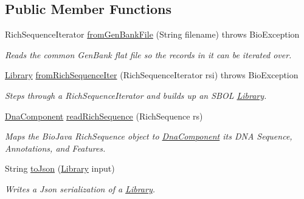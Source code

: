 \subsection*{Public Member Functions}
\begin{DoxyCompactItemize}
\item 
RichSequenceIterator \hyperlink{classorg_1_1sbolstandard_1_1lib_s_b_o_lj_1_1_s_b_o_lutil_a75fcd285825cf6c51c12ebb279ff6918}{fromGenBankFile} (String filename)  throws BioException 
\begin{DoxyCompactList}\small\item\em Reads the common GenBank flat file so the records in it can be iterated over. \item\end{DoxyCompactList}\item 
\hyperlink{classorg_1_1sbolstandard_1_1lib_s_b_o_lj_1_1_library}{Library} \hyperlink{classorg_1_1sbolstandard_1_1lib_s_b_o_lj_1_1_s_b_o_lutil_aa21346b8e64891b0d93df5de2d0b7de9}{fromRichSequenceIter} (RichSequenceIterator rsi)  throws BioException 
\begin{DoxyCompactList}\small\item\em Steps through a RichSequenceIterator and builds up an SBOL \hyperlink{classorg_1_1sbolstandard_1_1lib_s_b_o_lj_1_1_library}{Library}. \item\end{DoxyCompactList}\item 
\hyperlink{classorg_1_1sbolstandard_1_1lib_s_b_o_lj_1_1_dna_component}{DnaComponent} \hyperlink{classorg_1_1sbolstandard_1_1lib_s_b_o_lj_1_1_s_b_o_lutil_aaf09c65d0c5b097c12189b0287d00b3d}{readRichSequence} (RichSequence rs)
\begin{DoxyCompactList}\small\item\em Maps the BioJava RichSequence object to \hyperlink{classorg_1_1sbolstandard_1_1lib_s_b_o_lj_1_1_dna_component}{DnaComponent} its DNA Sequence, Annotations, and Features. \item\end{DoxyCompactList}\item 
String \hyperlink{classorg_1_1sbolstandard_1_1lib_s_b_o_lj_1_1_s_b_o_lutil_aa0ca1efec5b967390c8c607cb0b6a01d}{toJson} (\hyperlink{classorg_1_1sbolstandard_1_1lib_s_b_o_lj_1_1_library}{Library} input)
\begin{DoxyCompactList}\small\item\em Writes a Json serialization of a \hyperlink{classorg_1_1sbolstandard_1_1lib_s_b_o_lj_1_1_library}{Library}. \item\end{DoxyCompactList}\item 

\end{DoxyCompactItemize}
